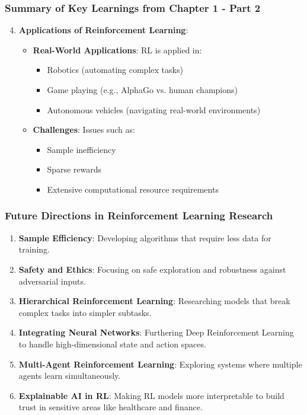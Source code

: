 \documentclass[aspectratio=169]{beamer}
\begin{document}
\begin{frame}[fragile]
    \frametitle{Summary of Key Learnings from Chapter 1 - Part 2}
    \begin{enumerate}
        \setcounter{enumi}{3} %
        \item \textbf{Applications of Reinforcement Learning}:
        \begin{itemize}
            \item \textbf{Real-World Applications}: RL is applied in:
            \begin{itemize}
                \item Robotics (automating complex tasks)
                \item Game playing (e.g., AlphaGo vs. human champions)
                \item Autonomous vehicles (navigating real-world environments)
            \end{itemize}
            \item \textbf{Challenges}: Issues such as:
            \begin{itemize}
                \item Sample inefficiency
                \item Sparse rewards
                \item Extensive computational resource requirements
            \end{itemize}
        \end{itemize}
    \end{enumerate}
\end{frame}

\begin{frame}[fragile]
    \frametitle{Future Directions in Reinforcement Learning Research}
    \begin{enumerate}
        \item \textbf{Sample Efficiency}: Developing algorithms that require less data for training.
        \item \textbf{Safety and Ethics}: Focusing on safe exploration and robustness against adversarial inputs.
        \item \textbf{Hierarchical Reinforcement Learning}: Researching models that break complex tasks into simpler subtasks.
        \item \textbf{Integrating Neural Networks}: Furthering Deep Reinforcement Learning to handle high-dimensional state and action spaces.
        \item \textbf{Multi-Agent Reinforcement Learning}: Exploring systems where multiple agents learn simultaneously.
        \item \textbf{Explainable AI in RL}: Making RL models more interpretable to build trust in sensitive areas like healthcare and finance.
    \end{enumerate}
\end{frame}
\end{document}
